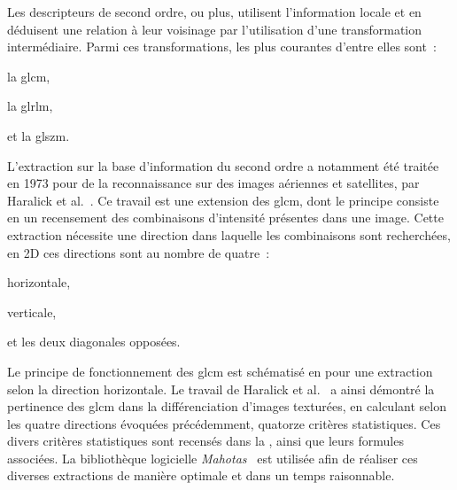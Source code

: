 Les descripteurs de second ordre, ou plus, utilisent l'information locale et en déduisent une relation à leur voisinage par l'utilisation d'une transformation intermédiaire. Parmi ces transformations, les plus courantes d'entre elles sont~: 
\begin{inlinerate}
    \item la \gls{glcm},
    \item la \gls{glrlm},
    \item et la \gls{glszm}.
\end{inlinerate} 
L'extraction sur la base d'information du second ordre a notamment été traitée en 1973 pour de la reconnaissance sur des images aériennes et satellites, par Haralick et al.~\cite{Haralick1973}. Ce travail est une extension des \gls{glcm}, dont le principe consiste en un recensement des combinaisons d'intensité présentes dans une image. Cette extraction nécessite une direction dans laquelle les combinaisons sont recherchées, en 2D ces directions sont au nombre de quatre~:
\begin{inlinerate}
    \item horizontale,
    \item verticale,
    \item et les deux diagonales opposées.
\end{inlinerate}
Le principe de fonctionnement des \gls{glcm} est schématisé en  pour une extraction selon la direction horizontale. Le travail de Haralick et al.~\cite{Haralick1973} a ainsi démontré la pertinence des \gls{glcm} dans la différenciation d'images texturées, en calculant selon les quatre directions évoquées précédemment, quatorze critères statistiques. Ces divers critères statistiques sont recensés dans la , ainsi que leurs formules associées. La bibliothèque logicielle \textit{Mahotas}~\cite{coelho2012} est utilisée afin de réaliser ces diverses extractions de manière optimale et dans un temps raisonnable.\par
 
